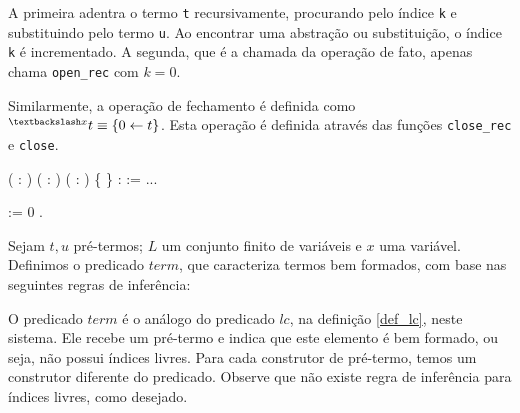 \bigskip

A primeira adentra o termo \texttt{t} recursivamente, procurando pelo índice
\texttt{k} e substituindo pelo termo \texttt{u}. Ao encontrar uma abstração ou
substituição, o índice \texttt{k} é incrementado.  A segunda, que é a chamada da
operação de fato, apenas chama \texttt{open\_rec} com $k = 0$.

Similarmente, a operação de fechamento é definida como $ ^{\textbackslash x}t
\equiv \{0 \leftarrow t\}$. Esta operação é definida através das funções
\texttt{close\_rec} e \texttt{close}.

\bigskip

   ( :
)
( : ) ( : ) \{ \} :
 := ...\coqdoceol

    :=
 0
 .\coqdoceol

\bigskip

\begin{definicao}\label{def_term}
Sejam $t, u$ pré-termos; $L$ um conjunto finito de variáveis e $x$ uma variável.
Definimos o predicado $term$, que caracteriza termos bem formados, com base nas
seguintes regras de inferência:

\end{definicao}

O predicado $term$ é o análogo do predicado $lc$, na definição \ref{def_lc},
neste sistema. Ele recebe um pré-termo e indica que este elemento é bem
formado, ou seja, não possui índices livres. Para cada construtor de pré-termo,
temos um construtor diferente do predicado. Observe que não existe regra de
inferência para índices livres, como desejado.

